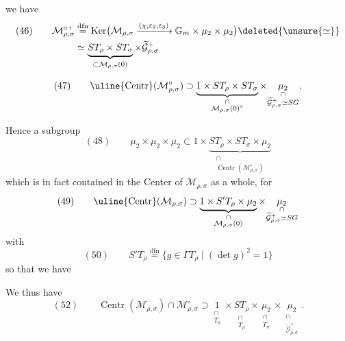 \par{}


we have
\[
\begin{aligned}
(46)\qquad
\mathcal M_{\rho,\sigma}^{\circ+}
&\overset{\mathrm{dfn}}{=}
\operatorname{Ker}\bigl(\mathcal M_{\rho,\sigma}
\xrightarrow{(\chi,\varepsilon_2,\varepsilon_3)}
\mathbb G_m\times\mu_2\times\mu_2\bigr)
\deleted{\unsure{\simeq}}\\
&\simeq
\underbrace{ST_\rho\times ST_\sigma}_{\subset\mathcal M_{\rho,\sigma}(0)}
\times\widetilde{\mathcal G}_{\rho,\sigma}^{+}
\end{aligned}
\]



\[
(47)\qquad
\uline{\operatorname{Centr}}(\mathcal M_{\rho,\sigma}^{\circ})
\supset
\underbrace{1\times ST_\rho\times ST_\sigma}_{\substack{\cap\\
\mathcal M_{\rho,\sigma}(0)^\circ}}
\times
\underset{\substack{\cap\\\widetilde{\mathcal G}_{\rho,\sigma}^{+}\simeq SG}}{\mu_2}.
\]

Hence a subgroup
\[
(48)\qquad
\mu_2\times\mu_2\times\mu_2
\subset 1\times
\underbrace{ST_\rho\times ST_\sigma\times\mu_2}_{\substack{\cap\\
\operatorname{Centr}(\mathcal M_{\rho,\sigma}^{\circ})}}
\]
which is in fact contained in the Center of $\mathcal M_{\rho,\sigma}$
as a whole, for
\[
(49)\qquad
\uline{\operatorname{Centr}}(\mathcal M_{\rho,\sigma})
\supset
\underbrace{1\times S'T_\rho\times\mu_2}_{\substack{\cap\\
\mathcal M_{\rho,\sigma}(0)}}
\times
\underset{\substack{\cap\\\widetilde{\mathcal G}_{\rho,\sigma}^{+}\simeq SG}}{\mu_2}
\]
with
\[
(50)\qquad
S'T_\rho\overset{\mathrm{dfn}}{=}
\{g\in\Gamma T_\rho\mid(\det g)^2=1\}
\]
so that we have

We thus have
\[
(52)\qquad
\operatorname{Centr}(\mathcal M_{\rho,\sigma})\cap
\mathcal M_{\rho,\sigma}^{\circ}
\supset
\underset{\substack{\cap\\T_0}}{1}\times
\underset{\substack{\cap\\T_\rho}}{ST_\rho}\times
\underset{\substack{\cap\\T_\sigma}}{\mu_2}\times
\underset{\substack{\cap\\\widetilde{\mathcal G}_{\rho,\sigma}^{+}}}{\mu_2}.
\]

